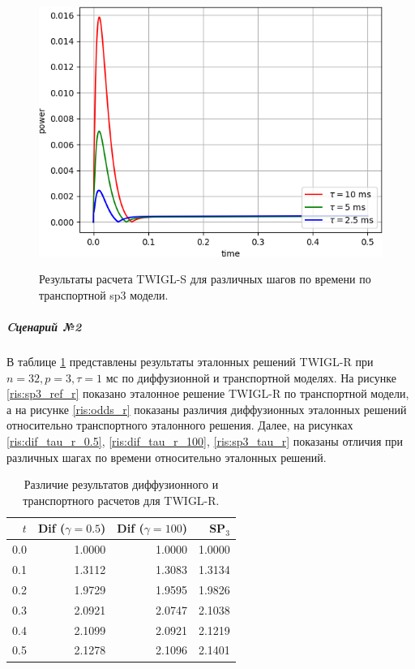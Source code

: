 \documentclass{crm-article}
\begin{document}
\begin{figure}[ht]
\begin{center}
	\includegraphics[width=0.5\linewidth]{sp3_tau_s.png}\\
	\caption{\label{image:canonsummary} Результаты расчета TWIGL-S для различных шагов по времени по транспортной sp3 модели.}
	\label{ris:sp3_tau_s}
\end{center}
\end{figure}

\pagebreak
\newpage

\subparagraph{Cценарий №2}
В таблице \ref{table:twigl-r} представлены результаты эталонных решений TWIGL-R при $n=32, p=3, \tau=1$ мс по диффузионной и транспортной моделях.
На рисунке \ref{ris:sp3_ref_r} показано эталонное решение TWIGL-R по транспортной модели, а на рисунке \ref{ris:odds_r} показаны различия диффузионных эталонных решений относительно транспортного эталонного решения. 
Далее, на рисунках \ref{ris:dif_tau_r_0.5}, \ref{ris:dif_tau_r_100}, \ref{ris:sp3_tau_r} показаны отличия при различных шагах по времени относительно эталонных решений.

\begin{table}[ht]
\caption{Различие результатов диффузионного и транспортного расчетов для TWIGL-R.}
\label{table:twigl-r}
\begin{center}
\begin{tabular}{r r r r}
\hline
$t$ & Dif ($\gamma=0.5$) & Dif ($\gamma=100$) & SP$_3$\\
\hline
0.0 & 1.0000 & 1.0000 & 1.0000\\
0.1 & 1.3112  & 1.3083 & 1.3134\\
0.2 & 1.9729 & 1.9595 & 1.9826\\
0.3 & 2.0921 & 2.0747 & 2.1038\\
0.4 & 2.1099 & 2.0921 & 2.1219\\
0.5 & 2.1278 & 2.1096 & 2.1401\\
\hline
\end{tabular}
\end{center}
\end{table}
\end{document}
